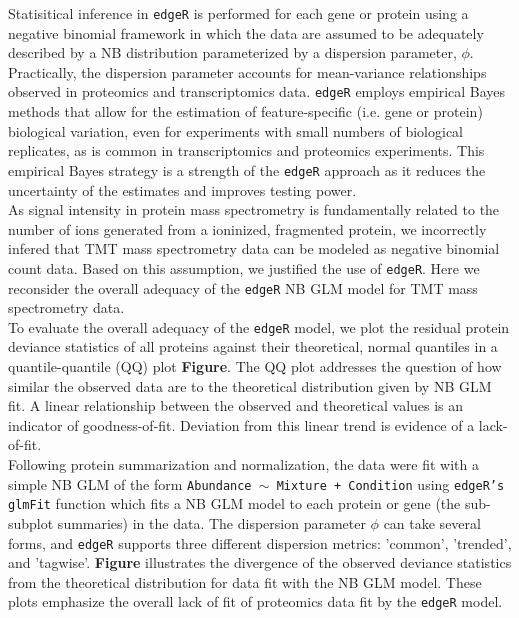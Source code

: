 \documentclass[11pt]{elife}\usepackage[]{graphicx}\usepackage[]{color}
\begin{document}
Statisitical inference in \texttt{edgeR} is performed for each gene or protein
using a negative binomial framework in which the data are assumed to be 
adequately described by a NB distribution parameterized by a dispersion 
parameter, $\phi$. Practically, the dispersion parameter accounts for 
mean-variance relationships observed in proteomics and transcriptomics data. 
\texttt{edgeR} employs empirical Bayes methods that allow for the 
estimation of feature-specific (i.e. gene or protein) biological variation, 
even for experiments with small numbers of biological replicates, as is common 
in transcriptomics and proteomics experiments. This empirical Bayes strategy is 
a strength of the \texttt{edgeR} approach as it reduces the uncertainty of the 
estimates and improves testing power.\\

As signal intensity in protein mass spectrometry is fundamentally related to the
number of ions generated from a ioninized, fragmented protein, we incorrectly
infered that TMT mass spectrometry data can be modeled as negative binomial
count data. Based on this assumption, we justified the use of \texttt{edgeR}.
Here we reconsider the overall adequacy of the \texttt{edgeR} NB GLM model for
TMT mass spectrometry data.\\

To evaluate the overall adequacy of the \texttt{edgeR} model, we plot the 
residual protein deviance statistics of all proteins against their theoretical, 
normal quantiles in a quantile-quantile (QQ) plot \textbf{Figure}.
The QQ plot addresses the question of how similar the observed data are to the
theoretical distribution given by NB GLM fit. A linear relationship between the
observed and theoretical values is an indicator of goodness-of-fit.
Deviation from this linear trend is evidence of a lack-of-fit.\\

Following protein summarization and normalization, the data were fit with 
a simple NB GLM of the form \texttt{Abundance $\sim$ Mixture + Condition} using
\texttt{edgeR's} \texttt{glmFit} function which fits a NB GLM model to each
protein or gene (the sub-subplot summaries) in the data. The dispersion
parameter $\phi$ can take several forms, and \texttt{edgeR} supports three 
different dispersion metrics: 'common', 'trended', and 'tagwise'. 
\textbf{Figure} illustrates the divergence of the observed deviance statistics 
from the theoretical distribution for data fit with the NB GLM model. 
These plots emphasize the overall lack of fit of proteomics data 
fit by the \texttt{edgeR} model.\\ 
\end{document}
